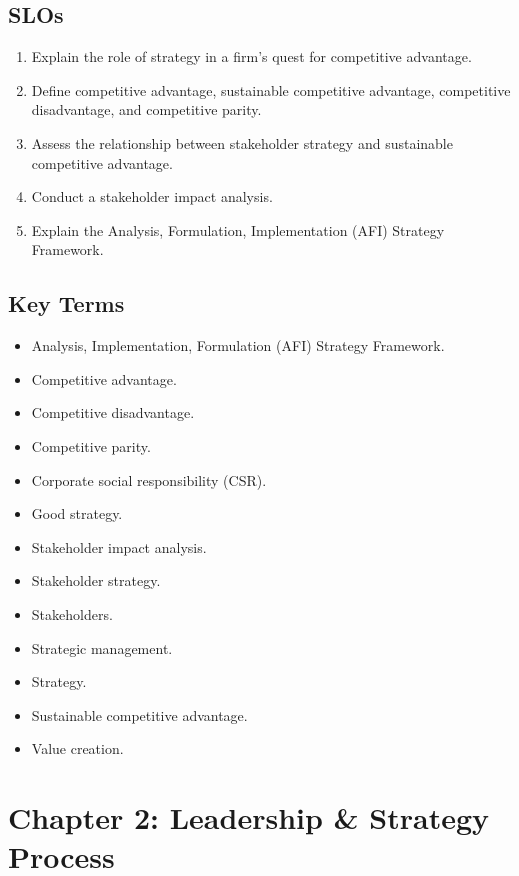 \documentclass[
]{book}
\providecommand{\tightlist}{%
  \setlength{\itemsep}{0pt}\setlength{\parskip}{0pt}}
\begin{document}
\hypertarget{slos}{%
\section{SLOs}\label{slos}}

\begin{enumerate}
\def\labelenumi{\arabic{enumi}.}
\tightlist
\item
  Explain the role of strategy in a firm's quest for competitive advantage.
\item
  Define competitive advantage, sustainable competitive advantage, competitive disadvantage, and competitive parity.
\item
  Assess the relationship between stakeholder strategy and sustainable competitive advantage.
\item
  Conduct a stakeholder impact analysis.
\item
  Explain the Analysis, Formulation, Implementation (AFI) Strategy Framework.
\end{enumerate}

\hypertarget{key-terms}{%
\section{Key Terms}\label{key-terms}}

\begin{itemize}
\tightlist
\item
  Analysis, Implementation, Formulation (AFI) Strategy Framework.
\item
  Competitive advantage.
\item
  Competitive disadvantage.
\item
  Competitive parity.
\item
  Corporate social responsibility (CSR).
\item
  Good strategy.
\item
  Stakeholder impact analysis.
\item
  Stakeholder strategy.
\item
  Stakeholders.
\item
  Strategic management.
\item
  Strategy.
\item
  Sustainable competitive advantage.
\item
  Value creation.
\end{itemize}

\hypertarget{chapter-2-leadership-strategy-process}{%
\chapter{Chapter 2: Leadership \& Strategy Process}\label{chapter-2-leadership-strategy-process}}
\end{document}
